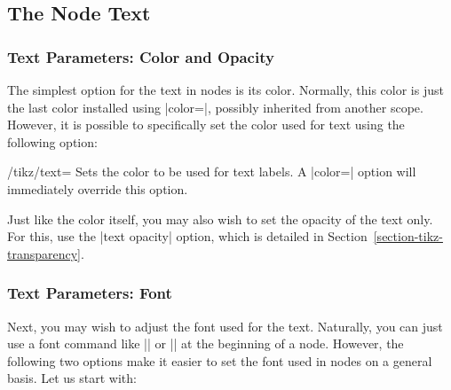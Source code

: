 \subsection{The Node Text}

\label{section-nodes-options}

\subsubsection{Text Parameters: Color and Opacity}

The simplest option for the text in nodes is its color. Normally, this
color is just the last color installed using |color=|, possibly
inherited from another scope. However, it is possible to specifically
set the color used for text using the following option:

\begin{key}{/tikz/text=}
  Sets the color to be used for text labels. A |color=| option
  will immediately override this option.
\begin{codeexample}[]
\end{codeexample}
\end{key}

Just like the color itself, you may also wish to set the opacity of
the text only. For this, use the |text opacity| option, which
is detailed in Section~\ref{section-tikz-transparency}.

\subsubsection{Text Parameters: Font}

Next, you may wish to adjust the font used for the text. Naturally,
you can just use a font command like |\small| or |\rm| at the
beginning of a node. However, the following two options make it easier
to set the font used in nodes on a general basis. Let us start with:

